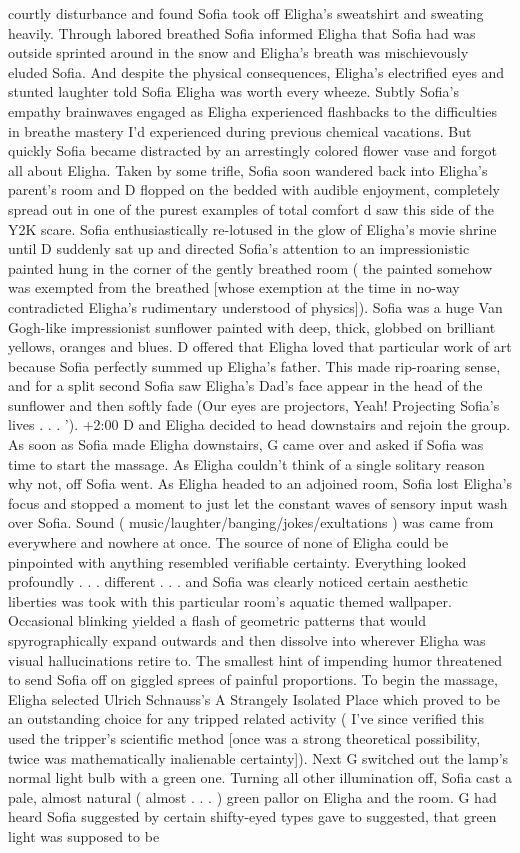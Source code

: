 \documentclass[12pt]{book}
\begin{document}
courtly disturbance and found Sofia took off Eligha's sweatshirt and sweating heavily. Through labored breathed Sofia informed Eligha that Sofia had was outside sprinted around in the snow and Eligha's breath was mischievously eluded Sofia. And despite the physical consequences, Eligha's electrified eyes and stunted laughter told Sofia Eligha was worth every wheeze. Subtly Sofia's empathy brainwaves engaged as Eligha experienced flashbacks to the difficulties in breathe mastery I'd experienced during previous chemical vacations. But quickly Sofia became distracted by an arrestingly colored flower vase and forgot all about Eligha. Taken by some trifle, Sofia soon wandered back into Eligha's parent's room and D flopped on the bedded with audible enjoyment, completely spread out in one of the purest examples of total comfort d saw this side of the Y2K scare. Sofia enthusiastically re-lotused in the glow of Eligha's movie shrine until D suddenly sat up and directed Sofia's attention to an impressionistic painted hung in the corner of the gently breathed room ( the painted somehow was exempted from the breathed [whose exemption at the time in no-way contradicted Eligha's rudimentary understood of physics]). Sofia was a huge Van Gogh-like impressionist sunflower painted with deep, thick, globbed on brilliant yellows, oranges and blues. D offered that Eligha loved that particular work of art because Sofia perfectly summed up Eligha's father. This made rip-roaring sense, and for a split second Sofia saw Eligha's Dad's face appear in the head of the sunflower and then softly fade (Our eyes are projectors, Yeah! Projecting Sofia's lives . . . '). +2:00 D and Eligha decided to head downstairs and rejoin the group. As soon as Sofia made Eligha downstairs, G came over and asked if Sofia was time to start the massage. As Eligha couldn't think of a single solitary reason why not, off Sofia went. As Eligha headed to an adjoined room, Sofia lost Eligha's focus and stopped a moment to just let the constant waves of sensory input wash over Sofia. Sound ( music/laughter/banging/jokes/exultations ) was came from everywhere and nowhere at once. The source of none of Eligha could be pinpointed with anything resembled verifiable certainty. Everything looked profoundly . . . different . . .  and Sofia was clearly noticed certain aesthetic liberties was took with this particular room's aquatic themed wallpaper. Occasional blinking yielded a flash of geometric patterns that would spyrographically expand outwards and then dissolve into wherever Eligha was visual hallucinations retire to. The smallest hint of impending humor threatened to send Sofia off on giggled sprees of painful proportions. To begin the massage, Eligha selected Ulrich Schnauss's A Strangely Isolated Place which proved to be an outstanding choice for any tripped related activity ( I've since verified this used the tripper's scientific method [once was a strong theoretical possibility, twice was mathematically inalienable certainty]). Next G switched out the lamp's normal light bulb with a green one. Turning all other illumination off, Sofia cast a pale, almost natural ( almost . . .  ) green pallor on Eligha and the room. G had heard Sofia suggested by certain shifty-eyed types gave to suggested, that green light was supposed to be 
\end{document}

